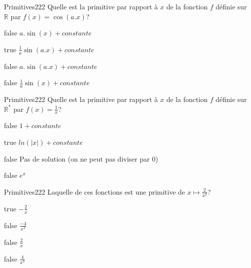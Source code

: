 \documentclass[11pt]{article}
\begin{document}
        	\begin{question}{61}{Primitives}{2}{22}
				Quelle est la primitive par rapport à $x$ de la fonction $f$ définie sur $\mathbb{R}$ par $f(x)=\cos(a.x)$?
            \end{question}

            \begin{reponses}
            	\item[false] $a.\sin(x)+constante$
            	\item[true] $\frac{1}{a}\sin(a.x)+constante$
                \item[false] $a.\sin(a.x)+constante$
                \item[false] $\frac{1}{a}\sin(x)+constante$
            \end{reponses}
        
        	\begin{question}{61}{Primitives}{2}{22}
				Quelle est la primitive par rapport à $x$ de la fonction $f$ définie sur $\mathbb{R^*}$ par $f(x)=\frac{1}{x}$?
            \end{question}

            \begin{reponses}
            	\item[false] $1+constante$
            	\item[true] $ln(|x|)+constante$
                \item[false] Pas de solution (on ne peut pas diviser par $0$)
                \item[false] $e^x$
            \end{reponses}

            \begin{question}{61}{Primitives}{2}{22}
                Laquelle de ces fonctions est une primitive de $x\mapsto \frac{2}{x^2}$? 
            \end{question}

            \begin{reponses}
                \item[true] $-\frac{2}{x}$
                \item[false] $\frac{-4}{x^3}$
                \item[false] $\frac{2}{x}$
                \item[false] $\frac{4}{x^3}$
            \end{reponses}
\end{document}

